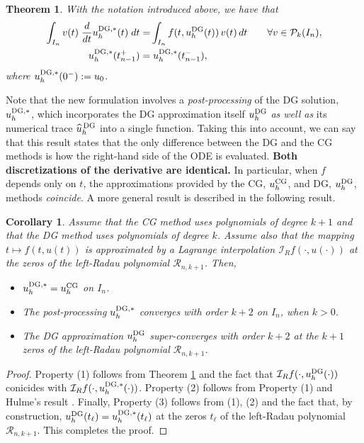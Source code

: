 \documentclass[bpam,reqno]{ipart}
\newtheorem{theorem}{Theorem}[section]
\newtheorem{corollary}{Corollary}[section]
\begin{document}
\begin{theorem}
\label{theorem3.1}
With the notation introduced above, we have that
\begin{alignat*}{2}
\int_{I_n}v(t)\; \frac{d}{dt} u^{{\rm DG},*}_h(t)\;dt =&
\int_{I_n}  f(t,u^{{\rm DG}}_h(t)) \,v(t)\,dt &&\quad\forall v\in \mathcal{P}_k(I_n),
\\
u^{{\rm DG},*}_h(t_{n-1}^+)=&\;u^{{\rm DG},*}_h(t_{n-1}^-),
\end{alignat*}
where $u^{{\rm DG},*}_h(0^-):=u_0$.
\end{theorem}
{ Note that the new formulation involves a {\it post-processing} of the DG solution, $u_h^{\rm DG,*}$, which incorporates  the DG approximation itself $u_h^{\rm DG}$ {\it as well as} its numerical trace $\widehat{u}^{\,{\rm DG}}_h$ into a single function. Taking this into account, we can say that this} result states that the only difference between the DG and the CG methods is how the right-hand side of the ODE is evaluated. {\bf Both discretizations of the derivative are identical.}  In particular, when $f$ depends only on $t$, the approximations provided {by the CG, $u_h^{\rm CG}$, and DG, $u_h^{\rm DG}$, methods} {\em coincide}. A more general result is described in the following result.


\begin{corollary}
\label{corollary3.1}
Assume that the CG method uses polynomials of degree $k+1$ and that the DG method uses polynomials of degree $k$. Assume also that the mapping $t\mapsto f(t,u(t))$ is approximated by a Lagrange interpolation $\mathcal{I}_R f(\cdot,u(\cdot))$ at the zeros of the left-Radau polynomial
$\mathcal{R}_{n,k+1}$. Then,
\begin{itemize}
    \item [{\rm (1)}] $u_h^{{\rm DG},*}=u_h^{{\rm CG}}$ on $I_n$.
   \item [{\rm (2)}] The post-processing $u_h^{{\rm DG},*}$ converges with order  $k+2$ on $I_n$, when $k>0$.
      \item [{\rm (3)}]  The DG approximation $u^{{\rm DG}}_h$ {\em super-converges} with order $k+2$ at the $k+1$ zeros of the left-Radau polynomial $\mathcal{R}_{n,k+1}$. 
\end{itemize}
\end{corollary}
\begin{proof} Property (1) follows from Theorem \ref{theorem3.1} and the fact that
{\small $\mathcal{I}_R f(\cdot,u_h^{{\rm DG}}(\cdot))$ conicides with $
\mathcal{I}_R f(\cdot,u_h^{{\rm DG},*}(\cdot))$}. Property (2) follows from Property (1) and  Hulme's result \cite[Theorem 2]{HulmeII72}. Finally, Property (3) follows from (1), (2) and the fact that, by construction,
$u_h^{{\rm DG}}(t_\ell)=u_h^{{\rm DG},*}(t_\ell)$
at the zeros $t_\ell$ of the left-Radau polynomial $\mathcal{R}_{n,k+1}$. This completes the proof.
\end{proof}
\end{document}

